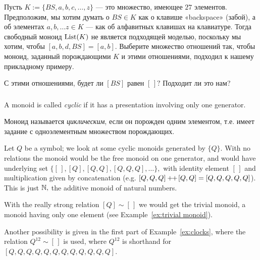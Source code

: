 \documentclass[CT4S-EN-RU]{subfiles}
\begin{document}
\begin{exerciseRUS}
Пусть $K:=\{BS,a,b,c,\ldots,z\}$ — это множество, имеющее $27$ элементов. Предположим, мы хотим думать о $BS\in K$ как о клавише «backspace» (забой), а об элементах $a,b,\ldots z\in K$ — как об алфавитных клавишах на клавиатуре. Тогда свободный моноид $\operatorname{List}(K)$ не является подходящей моделью, поскольку мы хотим, чтобы $[a,b,d,BS]=[a,b].$
\sexc Выберите множество отношений так, чтобы моноид, заданный порождающими $K$ и этими отношениями, подходил к нашему прикладному примеру.
\item С этими отношениями, будет ли $[BS]$ равен $[\,]?$ Подходит ли это нам?
\endsexc
\end{exerciseRUS}


\subsubsection{}

\begin{definitionENG}
A monoid is called {\em cyclic} if it has a presentation involving only one generator.
\end{definitionENG}

\begin{definitionRUS}
Моноид называется {\em циклическим}, если он порожден одним элементом, т.е. имеет задание с одноэлементным множеством порождающих.
\end{definitionRUS}

\begin{exampleENG}\label{ex:cyclic}
Let $Q$ be a symbol; we look at some cyclic monoids generated by $\{Q\}.$ With no relations the monoid would be the free monoid on one generator, and would have underlying set $\{[\,],[Q],[Q,Q],[Q,Q,Q],\ldots\},$ with identity element $[\,]$ and multiplication given by concatenation (e.g. $[Q,Q,Q]+\!\!+\hspace{1pt}[Q,Q]=[Q,Q,Q,Q,Q]$). This is just ${\mathbb N},$ the additive monoid of natural numbers.

With the really strong relation $[Q]\sim[\,]$ we would get the trivial monoid, a monoid having only one element (see Example~\ref{ex:trivial monoid}).

Another possibility is given in the first part of Example~\ref{ex:clocks}, where the relation $Q^{12}\sim[\,]$ is used, where $Q^{12}$ is shorthand for $[Q,Q,Q,Q,Q,Q,Q,Q,Q,Q,Q,Q].$
\end{exampleENG}
\end{document}

